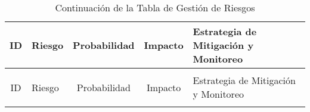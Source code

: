 \begin{longtable}[c]{c p{4cm} c c p{6cm}}
  \toprule
  ID   & \centering Riesgo                                                                                                                                                                                                                                                 & Probabilidad & Impacto & Estrategia de Mitigación y Monitoreo                                                                                                                                                                                                                                                                                                                                                                                                                      \\
  \midrule
  \endfirsthead
  \caption{Continuación de la Tabla de Gestión de Riesgos}                                                                                                                                                                                                                                                                                                                                                                                                                                                                                                                                                                                                                                                                                                      \\
  \toprule
  ID   & \centering Riesgo                                                                                                                                                                                                                                                 & Probabilidad & Impacto & Estrategia de Mitigación y Monitoreo                                                                                                                                                                                                                                                                                                                                                                                                                      \\
  \midrule
  \endhead
  \endfoot
  \endlastfoot


\end{longtable}
